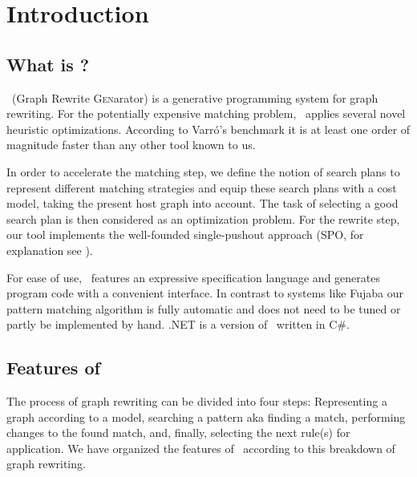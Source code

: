 \chapter{Introduction}


\section{What is \GrG?}

\GrG\ (\textsc{G}raph \textsc{R}ewrite \textsc{Gen}arator) is a generative programming system for graph rewriting.
For the potentially expensive matching problem, \GrG\ applies several novel heuristic optimizations.
According to Varr\'o's benchmark it is at least one order of magnitude faster than any other tool known to us.

In order to accelerate the matching step, we define the notion of search plans to represent different matching strategies and equip these search plans with a cost model, taking the present host graph into account.
The task of selecting a good search plan is then considered as an optimization problem.
For the rewrite step, our tool implements the well-founded single-pushout approach (SPO, for explanation see \cite{spo}).

For ease of use, \GrG\ features an expressive specification language and generates program code with a convenient interface.
In contrast to systems like Fujaba \cite{fujaba} our pattern matching algorithm is fully automatic and does not need to be tuned or partly be implemented by hand.
\GrG.NET is a version of \GrG\ written in C\#.


\section{Features of \GrG}

The process of graph rewriting can be divided into four steps:
Representing a graph according to a model, searching a pattern aka finding a match, performing changes to the found match, and, finally, selecting the next rule(s) for application.
We have organized the features of \GrG\ according to this breakdown of graph rewriting.

